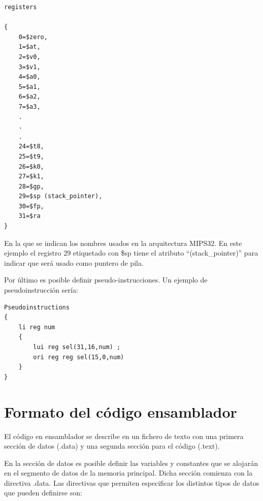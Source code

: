\begin{lstlisting}
registers

{ 
	0=$zero, 
	1=$at, 
	2=$v0, 
	3=$v1, 
	4=$a0, 
	5=$a1, 
	6=$a2, 
	7=$a3, 
	. 
	. 
	. 
	24=$t8, 
	25=$t9, 
	26=$k0, 
	27=$k1, 
	28=$gp, 
	29=$sp (stack_pointer), 
	30=$fp, 
	31=$ra 
}
\end{lstlisting}

En la que se indican los nombres usados en la arquitectura MIPS32. En este ejemplo el registro 29 etiquetado con \$sp tiene el atributo ``(stack\_pointer)'' para indicar que será usado como puntero de pila.

Por último es posible definir pseudo-instrucciones. Un ejemplo de pseudoinstrucción sería:

\begin{lstlisting}
Pseudoinstructions
{
	li reg num
	{
		lui reg sel(31,16,num) ;
		ori reg reg sel(15,0,num)
	}
}
\end{lstlisting}

\section*{Formato del código ensamblador}

El código en ensamblador se describe en un fichero de texto con una primera sección de datos (.data) y una segunda sección para el código (.text).

En la sección de datos es posible definir las variables y constantes que se alojarán en el segmento de datos de la memoria principal. Dicha sección comienza con la directiva .data. Las directivas que permiten especificar los distintos tipos de datos que pueden definirse son:

